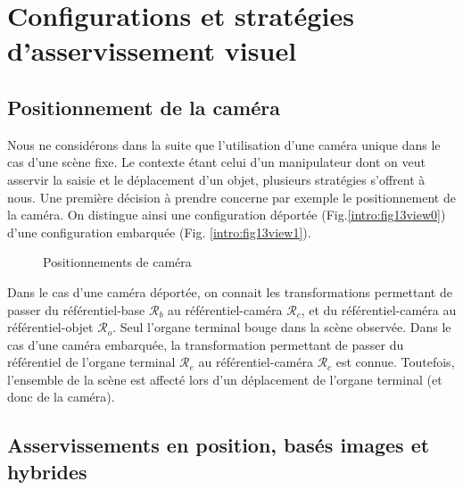 \section{Configurations et stratégies d'asservissement visuel} 
\label{chap1-1}

\subsection{Positionnement de la caméra} \label{chap1-1-0}

Nous ne considérons dans la suite que l'utilisation d'une caméra unique dans le 
cas d'une scène fixe. Le contexte étant celui d'un manipulateur dont on veut 
asservir la saisie et le déplacement d'un objet, plusieurs stratégies s'offrent 
à nous. Une première décision à prendre concerne par exemple le positionnement 
de la caméra. On distingue ainsi une configuration déportée 
(Fig.\ref{intro:fig13view0}) d'une configuration embarquée (Fig. 
\ref{intro:fig13view1}).

\begin{figure}[htp]
  \centering
   \hfill
    \caption{\footnotesize{Positionnements de caméra}}
\label{intro:fig13}
\end{figure}

Dans le cas d'une caméra déportée, on connait les transformations permettant de 
passer du référentiel-base $\mathcal R_b$ au référentiel-caméra $\mathcal R_c$, 
et du référentiel-caméra au référentiel-objet $\mathcal R_o$. Seul l'organe 
terminal bouge dans la scène observée. Dans le cas d'une caméra embarquée, la 
transformation permettant de passer du référentiel de l'organe terminal 
$\mathcal R_e$ au référentiel-caméra $\mathcal R_c$ est connue. Toutefois, 
l'ensemble de la scène est affecté lors d'un déplacement de l'organe terminal 
(et donc de la caméra).

\subsection{Asservissements en position, basés images et hybrides} 
\label{chap1-1-1}

